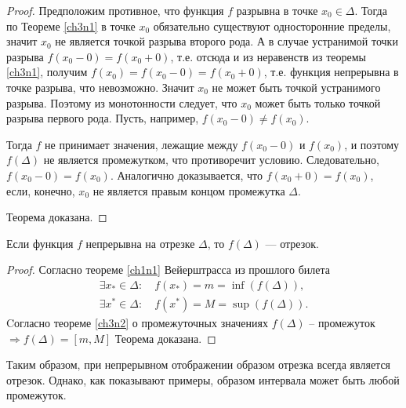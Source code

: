 \begin{proof}
Предположим противное, что функция $f$ разрывна в точке $x_0 \in\Delta$. Тогда по Теореме \ref{ch3n1} в точке $x_0$ обязательно существуют односторонние пределы, значит $x_0$ не является точкой разрыва второго рода.  А в случае устранимой точки разрыва $f(x_0-0)=f(x_0+0)$, т.е. отсюда и из неравенств из теоремы  \ref{ch3n1}, получим $f(x_0)=f(x_0-0)=f(x_0+0)$, т.е. функция непрерывна в точке разрыва, что невозможно. Значит $x_0$ не может быть точкой устранимого разрыва. Поэтому из монотонности следует, что $x_0$ может быть только точкой разрыва первого рода. Пусть, например, $f(x_0-0)\ne f(x_0)$.

Тогда $f$ не принимает значения, лежащие между $f(x_0 - 0)$ и $f(x_0)$, и поэтому $f(\Delta)$ не является промежутком, что противоречит условию. Следовательно, $f(x_0-0) = f(x_0)$. Аналогично доказывается, что  $f(x_0 + 0) = f(x_0)$, если, конечно, $x_0$ не является правым концом промежутка $\Delta$. 

\noindent
Теорема доказана.
\end{proof} 

\begin{thm}
Если функция $f$ непрерывна на отрезке $\Delta$, то $f(\Delta)$ — отрезок.
\end{thm}
\begin{proof}
Согласно теореме \ref{ch1n1} Вейерштрасса из прошлого билета 
\begin{gather*}
\exists x_* \in \Delta:\quad f(x_*)=m=\inf(f(\Delta)),\\
\exists x^* \in \Delta:\quad f(x^*)=M=\sup(f(\Delta)).
\end{gather*}   
Cогласно теореме \ref{ch3n2} о промежуточных значениях $f(\Delta)$ -- промежуток $\Rightarrow f(\Delta)=[m,M]$ 
\noindent
Теорема доказана.
\end{proof} 

Таким образом, при непрерывном отображении образом отрезка всегда является отрезок. Однако, как показывают примеры, образом интервала может быть любой промежуток.
